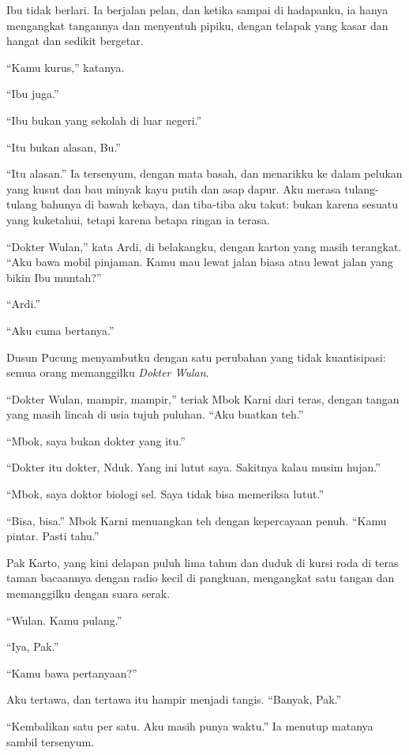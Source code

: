 \documentclass[11pt,twoside,openany]{book}
\makeatletter
\newcommand{\scenebreak}{\par\vspace{0.9em}{\centering\textsc{*\hspace{0.7em}*\hspace{0.7em}*}\par}\vspace{0.9em}\@afterindentfalse\@afterheading}
\makeatother
\begin{document}
Ibu tidak berlari. Ia berjalan pelan, dan ketika sampai di hadapanku, ia hanya mengangkat tangannya dan menyentuh pipiku, dengan telapak yang kasar dan hangat dan sedikit bergetar.

``Kamu kurus,'' katanya.

``Ibu juga.''

``Ibu bukan yang sekolah di luar negeri.''

``Itu bukan alasan, Bu.''

``Itu alasan.'' Ia tersenyum, dengan mata basah, dan menarikku ke dalam pelukan yang kusut dan bau minyak kayu putih dan asap dapur. Aku merasa tulang-tulang bahunya di bawah kebaya, dan tiba-tiba aku takut: bukan karena sesuatu yang kuketahui, tetapi karena betapa ringan ia terasa.

``Dokter Wulan,'' kata Ardi, di belakangku, dengan karton yang masih terangkat. ``Aku bawa mobil pinjaman. Kamu mau lewat jalan biasa atau lewat jalan yang bikin Ibu muntah?''

``Ardi.''

``Aku cuma bertanya.''

\scenebreak
Dusun Pucung menyambutku dengan satu perubahan yang tidak kuantisipasi: semua orang memanggilku \emph{Dokter Wulan}.

``Dokter Wulan, mampir, mampir,'' teriak Mbok Karni dari teras, dengan tangan yang masih lincah di usia tujuh puluhan. ``Aku buatkan teh.''

``Mbok, saya bukan dokter yang itu.''

``Dokter itu dokter, Nduk. Yang ini lutut saya. Sakitnya kalau musim hujan.''

``Mbok, saya doktor biologi sel. Saya tidak bisa memeriksa lutut.''

``Bisa, bisa.'' Mbok Karni menuangkan teh dengan kepercayaan penuh. ``Kamu pintar. Pasti tahu.''

Pak Karto, yang kini delapan puluh lima tahun dan duduk di kursi roda di teras taman bacaannya dengan radio kecil di pangkuan, mengangkat satu tangan dan memanggilku dengan suara serak.

``Wulan. Kamu pulang.''

``Iya, Pak.''

``Kamu bawa pertanyaan?''

Aku tertawa, dan tertawa itu hampir menjadi tangis. ``Banyak, Pak.''

``Kembalikan satu per satu. Aku masih punya waktu.'' Ia menutup matanya sambil tersenyum.
\end{document}
